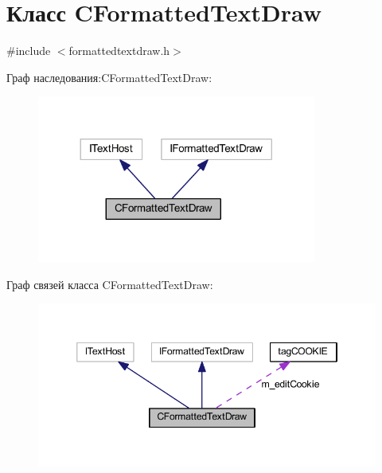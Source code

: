 \hypertarget{class_c_formatted_text_draw}{\section{Класс C\-Formatted\-Text\-Draw}
\label{class_c_formatted_text_draw}
}


{\ttfamily \#include $<$formattedtextdraw.\-h$>$}



Граф наследования\-:C\-Formatted\-Text\-Draw\-:
\nopagebreak
\begin{figure}[H]
\begin{center}
\leavevmode
\includegraphics[width=260pt]{class_c_formatted_text_draw__inherit__graph}
\end{center}
\end{figure}


Граф связей класса C\-Formatted\-Text\-Draw\-:
\nopagebreak
\begin{figure}[H]
\begin{center}
\leavevmode
\includegraphics[width=346pt]{class_c_formatted_text_draw__coll__graph}
\end{center}
\end{figure}
